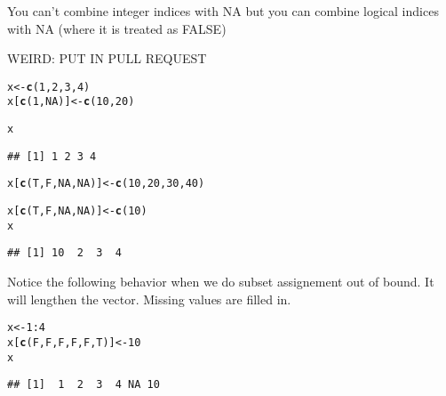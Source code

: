 \documentclass{article}\usepackage[]{graphicx}\usepackage[]{color}
\makeatletter
\newcommand{\hlnum}[1]{\textcolor[rgb]{0.686,0.059,0.569}{#1}}%
\newcommand{\hlopt}[1]{\textcolor[rgb]{0,0,0}{#1}}%
\newcommand{\hlstd}[1]{\textcolor[rgb]{0.345,0.345,0.345}{#1}}%
\newcommand{\hlkwb}[1]{\textcolor[rgb]{0.69,0.353,0.396}{#1}}%
\newcommand{\hlkwd}[1]{\textcolor[rgb]{0.737,0.353,0.396}{\textbf{#1}}}%
\newenvironment{kframe}{%
 \def\at@end@of@kframe{}%
 \ifinner\ifhmode%
  \def\at@end@of@kframe{\end{minipage}}%
  \begin{minipage}{\columnwidth}%
 \fi\fi%
 \def\FrameCommand##1{\hskip\@totalleftmargin \hskip-\fboxsep
 \colorbox{shadecolor}{##1}\hskip-\fboxsep
     \hskip-\linewidth \hskip-\@totalleftmargin \hskip\columnwidth}%
 \MakeFramed {\advance\hsize-\width
   \@totalleftmargin\z@ \linewidth\hsize
   \@setminipage}}%
 {\par\unskip\endMakeFramed%
 \at@end@of@kframe}
\newenvironment{knitrout}{}{} %
\makeatother
\begin{document}
You can't combine integer indices with NA but you can combine logical indices with NA (where it is treated as FALSE)

WEIRD: PUT IN PULL REQUEST

\begin{knitrout}
\color{fgcolor}\begin{kframe}
\begin{alltt}
\hlstd{x} \hlkwb{<-} \hlkwd{c}\hlstd{(}\hlnum{1}\hlstd{,} \hlnum{2}\hlstd{,} \hlnum{3}\hlstd{,} \hlnum{4}\hlstd{)}
\hlstd{x[}\hlkwd{c}\hlstd{(}\hlnum{1}\hlstd{,} \hlnum{NA}\hlstd{)]} \hlkwb{<-} \hlkwd{c}\hlstd{(}\hlnum{10}\hlstd{,} \hlnum{20}\hlstd{)}
\end{alltt}


{\ttfamily\noindent\bfseries\color{errorcolor}{\#\# Error: NAs are not allowed in subscripted assignments}}\begin{alltt}
\hlstd{x}
\end{alltt}
\begin{verbatim}
## [1] 1 2 3 4
\end{verbatim}
\begin{alltt}
\hlstd{x[}\hlkwd{c}\hlstd{(T, F,} \hlnum{NA}\hlstd{,} \hlnum{NA}\hlstd{)]} \hlkwb{<-} \hlkwd{c}\hlstd{(}\hlnum{10}\hlstd{,} \hlnum{20}\hlstd{,} \hlnum{30}\hlstd{,} \hlnum{40}\hlstd{)}
\end{alltt}


{\ttfamily\noindent\bfseries\color{errorcolor}{\#\# Error: NAs are not allowed in subscripted assignments}}\begin{alltt}
\hlstd{x[}\hlkwd{c}\hlstd{(T, F,} \hlnum{NA}\hlstd{,} \hlnum{NA}\hlstd{)]} \hlkwb{<-} \hlkwd{c}\hlstd{(}\hlnum{10}\hlstd{)}
\hlstd{x}
\end{alltt}
\begin{verbatim}
## [1] 10  2  3  4
\end{verbatim}
\end{kframe}
\end{knitrout}

Notice the following behavior when we do subset assignement out of bound. It will lengthen the vector. Missing values are filled in.
\begin{knitrout}
\color{fgcolor}\begin{kframe}
\begin{alltt}
\hlstd{x} \hlkwb{<-} \hlnum{1}\hlopt{:}\hlnum{4}
\hlstd{x[}\hlkwd{c}\hlstd{(F, F, F, F, F, T)]} \hlkwb{<-} \hlnum{10}
\hlstd{x}
\end{alltt}
\begin{verbatim}
## [1]  1  2  3  4 NA 10
\end{verbatim}
\end{kframe}
\end{knitrout}
\end{document}
